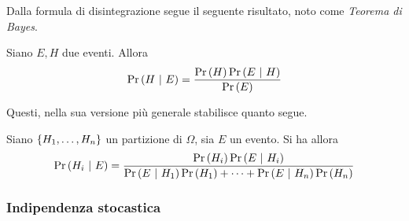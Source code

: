 \documentclass{subfiles}
\begin{document}
Dalla formula di disintegrazione segue il seguente risultato, noto come \emph{Teorema di Bayes}.
\begin{Theorem*}[di Bayes]
    Siano \(E, H\) due eventi. Allora
    \[
        \Prob{H}[E] = \Frac{\Prob{H} \Prob{E}[H]}{\Prob{E}}
    \]
\end{Theorem*}
Questi, nella sua versione più generale stabilisce quanto segue.
\begin{Theorem*}
    Siano \(\Set{\List{H}{1}{n}}\) un partizione di \(\Omega\), sia \(E\) un evento.
    Si ha allora
    \[
        \Prob{H_{i}}[E] = \Frac{\Prob{H_{i}} \Prob{E}[H_{i}]}{\Prob{E}[H_{1}] \Prob{H_{1}} + \cdots + \Prob{E}[H_{n}] \Prob{H_{n}}}
    \]
\end{Theorem*}

\subsubsection{Indipendenza stocastica}

\end{document}
